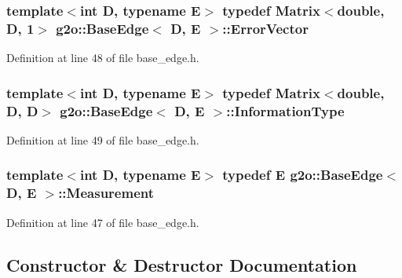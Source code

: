 \subsubsection[{\texorpdfstring{Error\+Vector}{ErrorVector}}]{\setlength{\rightskip}{0pt plus 5cm}template$<$int D, typename E$>$ typedef Matrix$<$double, D, 1$>$ {\bf g2o\+::\+Base\+Edge}$<$ D, E $>$\+::{\bf Error\+Vector}}\hypertarget{classg2o_1_1BaseEdge_af5b558dd24e4be2e437563cae4b3550d}{}\label{classg2o_1_1BaseEdge_af5b558dd24e4be2e437563cae4b3550d}


Definition at line 48 of file base\+\_\+edge.\+h.

\subsubsection[{\texorpdfstring{Information\+Type}{InformationType}}]{\setlength{\rightskip}{0pt plus 5cm}template$<$int D, typename E$>$ typedef Matrix$<$double, D, D$>$ {\bf g2o\+::\+Base\+Edge}$<$ D, E $>$\+::{\bf Information\+Type}}\hypertarget{classg2o_1_1BaseEdge_a2e5a33343ac3f189d8a7d5ee4d8b73fc}{}\label{classg2o_1_1BaseEdge_a2e5a33343ac3f189d8a7d5ee4d8b73fc}


Definition at line 49 of file base\+\_\+edge.\+h.

\subsubsection[{\texorpdfstring{Measurement}{Measurement}}]{\setlength{\rightskip}{0pt plus 5cm}template$<$int D, typename E$>$ typedef E {\bf g2o\+::\+Base\+Edge}$<$ D, E $>$\+::{\bf Measurement}}\hypertarget{classg2o_1_1BaseEdge_a2c148abba650a20b8c7eed75d3e2211e}{}\label{classg2o_1_1BaseEdge_a2c148abba650a20b8c7eed75d3e2211e}


Definition at line 47 of file base\+\_\+edge.\+h.



\subsection{Constructor \& Destructor Documentation}
